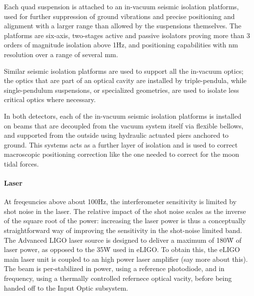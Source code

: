 Each quad suspension is attached to an in-vacuum seismic isolation platforms, used for further suppression of ground vibrations and precise positioning and alignment with a larger range than allowed by the suspensions themselves. The platforms are six-axis, two-stages active and passive isolators proving more than 3 orders of magnitude isolation above 1\.Hz, and positioning capabilities with nm resolution over a range of several mm.

Similar seismic isolation platforms are used to support all the in-vacuum optics; the optics that are part of an optical cavity are installed by triple-pendula, while single-pendulum suspensions, or specialized geometries, are used to isolate less critical optics where necessary.

In both detectors, each of the in-vacuum seismic isolation platforms is installed on beams that are decoupled from the vacuum system itself via flexible bellows, and supported from the outside using hydraulic actuated piers anchored to ground. This systems acts as a further layer of isolation and is used to correct macroscopic positioning correction like the one needed to correct for the moon tidal forces.


\paragraph*{Laser}
At freqeuncies above about 100\.Hz, the interferometer sensitivity is limited by shot noise in the laser. The relative impact of the shot noise scales as the inverse of the square root of the power: increasing the laser power is thus a conceptually straightforward way of improving the sensitivity in the shot-noise limited band. The Advanced LIGO laser source is designed to deliver a maximum of 180\.W of laser power, as opposed to the 35\.W used in eLIGO. To obtain this, the eLIGO main laser unit is coupled to an high power laser amplifier (say more about this). The beam is per-stabilized in power, using a reference photodiode, and in frequency, using a thermally controlled refernece optical vacity, before being handed off to the Input Optic subsystem.

